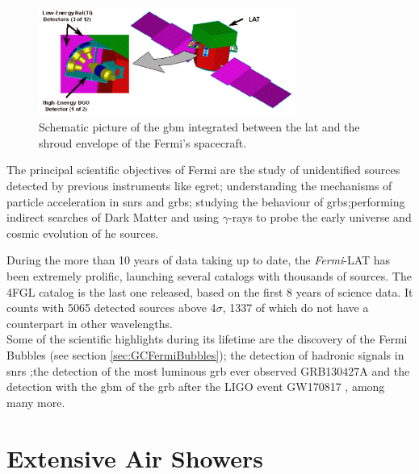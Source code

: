 \documentclass[main.tex]{subfiles}
\begin{document}
\begin{itemize}
    
    \begin{figure}
    \centering
    \includegraphics[width=0.75\textwidth]{Pictures/GBM.pdf}
    \caption{Schematic picture of the \gls{gbm} integrated between the \gls{lat} and the shroud envelope of the Fermi's spacecraft.}
    \label{fig:GBM}
    \end{figure}
    
\end{itemize}

The principal scientific objectives of Fermi are the study of unidentified sources detected by previous instruments like \gls{egret}; understanding the mechanisms of particle acceleration in \glspl{snr} and \glspl{grb}; studying the behaviour of \glspl{grb};performing indirect searches of Dark Matter and using $\gamma$-rays to probe the early universe and cosmic evolution of \gls{he} sources.

During the more than 10 years of data taking up to date, the \textit{Fermi}-LAT has been extremely prolific, launching several catalogs with thousands of sources. The 4FGL catalog is the last one released, based on the first 8 years of science data. It counts with 5065 detected sources above 4$\sigma$, 1337 of which do not have a counterpart in other wavelengths.\\
Some of the scientific highlights during its lifetime are the discovery of the Fermi Bubbles (see section \ref{sec:GCFermiBubbles}); the detection of hadronic signals in \glspl{snr} \cite{2013fermionSNRpiondecay};the detection of the most luminous \gls{grb} ever observed GRB130427A \cite{2014fermisuperGRB} and the detection with the \gls{gbm} of the \gls{grb} after the LIGO event GW170817 \cite{grb170817}, among many more. 

\section{Extensive Air Showers} \label{sec:eas}
\end{document}
